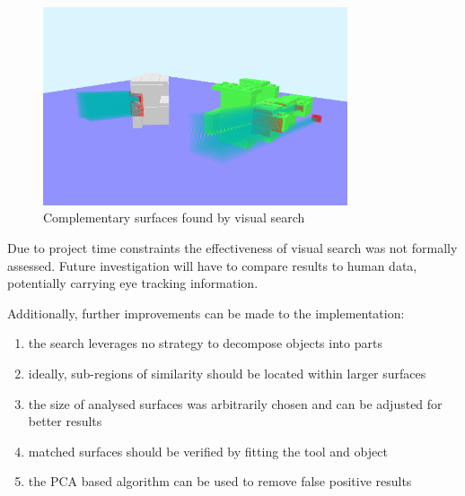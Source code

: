 \documentclass[
    floatsintext
]{article}
\begin{document}
\begin{figure}[!h]
  \centering
  \includegraphics[width=0.8\textwidth]{./figures/visual_search.png}
  \caption{Complementary surfaces found by visual search}
  \label{fig:visual_search}
\end{figure}  

Due to project time constraints the effectiveness of visual search was not formally assessed. 
Future investigation will have to compare results to human data, potentially carrying eye tracking information. 

Additionally, further improvements can be made to the implementation:
\begin{enumerate}
   \item the search leverages no strategy to decompose objects into parts 
   \item ideally, sub-regions of similarity should be located within larger surfaces 
   \item the size of analysed surfaces was arbitrarily chosen and can be adjusted for better results  
   \item matched surfaces should be verified by fitting the tool and object 
   \item the PCA based algorithm can be used to remove false positive results 
\end{enumerate}

\clearpage
\printbibliography 
\end{document}
